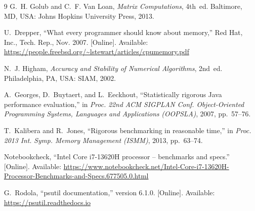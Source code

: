 \documentclass[11pt,a4paper]{article}
\begin{document}
\begin{thebibliography}{9}
G.~H. Golub and C.~F. Van Loan, \emph{Matrix Computations}, 4th~ed.
Baltimore, MD, USA: Johns Hopkins University Press, 2013.

U.~Drepper, ``What every programmer should know about memory,'' Red Hat, Inc.,
Tech. Rep., Nov. 2007. [Online]. Available: \url{https://people.freebsd.org/~lstewart/articles/cpumemory.pdf}

N.~J. Higham, \emph{Accuracy and Stability of Numerical Algorithms}, 2nd~ed.
Philadelphia, PA, USA: SIAM, 2002.

A.~Georges, D.~Buytaert, and L.~Eeckhout, ``Statistically rigorous Java performance
evaluation,'' in \emph{Proc. 22nd ACM SIGPLAN Conf. Object-Oriented Programming Systems,
Languages and Applications (OOPSLA)}, 2007, pp.~57--76.

T.~Kalibera and R.~Jones, ``Rigorous benchmarking in reasonable time,'' in
\emph{Proc. 2013 Int. Symp. Memory Management (ISMM)}, 2013, pp.~63--74.

Notebookcheck, ``Intel Core i7-13620H processor -- benchmarks and specs.'' [Online].
Available: \url{https://www.notebookcheck.net/Intel-Core-i7-13620H-Processor-Benchmarks-and-Specs.677505.0.html}

G.~Rodola, ``psutil documentation,'' version 6.1.0. [Online]. Available:
\url{https://psutil.readthedocs.io}
\end{thebibliography}
\end{document}
